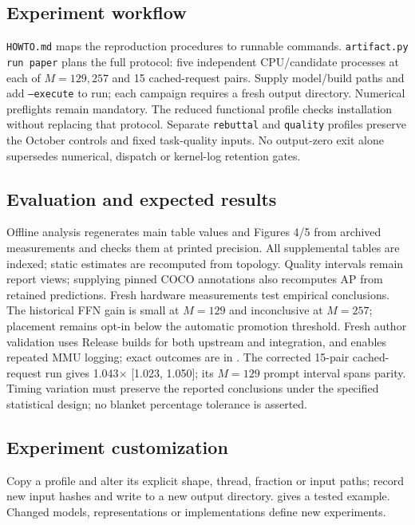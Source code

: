 \subsection{Experiment workflow}
\texttt{HOWTO.md} maps the reproduction procedures to runnable commands.
\texttt{artifact.py run paper} plans the full protocol: five independent
CPU/candidate processes at each of $M=129,257$ and 15 cached-request pairs.
Supply model/build paths and add \texttt{--execute} to run; each campaign
requires a fresh output directory. Numerical preflights remain mandatory.
The reduced functional profile checks installation without replacing that
protocol. Separate \texttt{rebuttal} and \texttt{quality} profiles preserve
the October controls and fixed task-quality inputs. No output-zero exit alone
supersedes numerical, dispatch or kernel-log retention gates.

\subsection{Evaluation and expected results}
Offline analysis regenerates main table values and Figures 4/5 from archived
measurements and checks them at printed precision. All supplemental tables
are indexed; static estimates are recomputed from topology. Quality intervals
remain report views; supplying pinned COCO annotations also recomputes AP
from retained predictions. Fresh hardware measurements test empirical conclusions.
The historical FFN gain is small at $M=129$ and inconclusive at $M=257$;
placement remains opt-in below the automatic promotion threshold.
Fresh author validation uses Release builds for both upstream and integration,
and enables repeated MMU logging; exact outcomes are in
. The corrected 15-pair cached-request run gives
1.043$\times$ [1.023, 1.050]; its $M=129$ prompt interval spans parity.
Timing variation must preserve the reported conclusions under the specified
statistical design; no blanket percentage tolerance is asserted.

\subsection{Experiment customization}
Copy a profile and alter its explicit shape, thread, fraction or input paths;
record new input hashes and write to a new output directory.
 gives a tested example. Changed models,
representations or implementations define new experiments.

